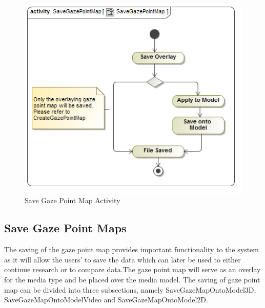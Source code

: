 	\begin{figure}[!ht]
		\centering
		\includegraphics[scale=0.5,width=15cm,keepaspectratio]{Diagrams/Activity_Diagram__SaveGazePointMap__SaveGazePointMap.png}
		\caption{Save Gaze Point Map Activity}
	\end{figure}
	
\subsection{Save Gaze Point Maps}
	The saving of the gaze point map provides important functionality to the system as it will allow the users' to save the data which can later be used to either continue research or to compare data.The gaze point map will serve as an overlay for the media type and be placed over the media model. The saving of gaze point map can be divided into three subsections, namely SaveGazeMapOntoModel3D, SaveGazeMapOntoModelVideo and SaveGazeMapOntoModel2D.
	\newline
	

